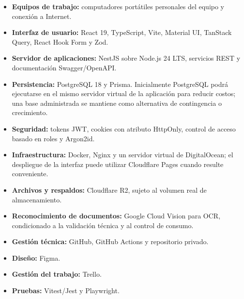 \documentclass[12pt,a4paper]{article}
\begin{document}
\begin{itemize}
    \item \textbf{Equipos de trabajo:} computadores portátiles personales del equipo y conexión a Internet.
    \item \textbf{Interfaz de usuario:} React 19, TypeScript, Vite, Material UI, TanStack Query, React Hook Form y Zod.
    \item \textbf{Servidor de aplicaciones:} NestJS sobre Node.js 24 LTS, servicios REST y documentación Swagger/OpenAPI.
    \item \textbf{Persistencia:} PostgreSQL 18 y Prisma. Inicialmente PostgreSQL podrá ejecutarse en el mismo servidor virtual de la aplicación para reducir costos; una base administrada se mantiene como alternativa de contingencia o crecimiento.
    \item \textbf{Seguridad:} tokens JWT, cookies con atributo HttpOnly, control de acceso basado en roles y Argon2id.
    \item \textbf{Infraestructura:} Docker, Nginx y un servidor virtual de DigitalOcean; el despliegue de la interfaz puede utilizar Cloudflare Pages cuando resulte conveniente.
    \item \textbf{Archivos y respaldos:} Cloudflare R2, sujeto al volumen real de almacenamiento.
    \item \textbf{Reconocimiento de documentos:} Google Cloud Vision para OCR, condicionado a la validación técnica y al control de consumo.
    \item \textbf{Gestión técnica:} GitHub, GitHub Actions y repositorio privado.
    \item \textbf{Diseño:} Figma.
    \item \textbf{Gestión del trabajo:} Trello.
    \item \textbf{Pruebas:} Vitest/Jest y Playwright.
\end{itemize}
\end{document}
